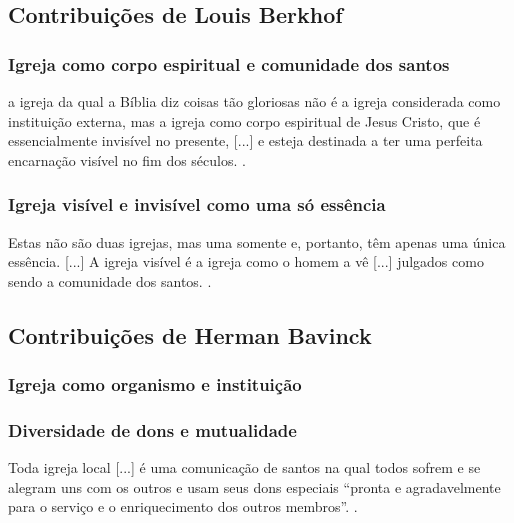 \subsection{Contribuições de Louis Berkhof}

\subsubsection{Igreja como corpo espiritual e comunidade dos santos}
\begin{citacao}
    a igreja da qual a Bíblia diz coisas tão gloriosas não é a igreja considerada como instituição externa, mas a igreja como corpo espiritual de Jesus Cristo, que é essencialmente invisível no presente, [...] e esteja destinada a ter uma perfeita encarnação visível no fim dos séculos. \cite[p. 644]{berkhof2012}.
\end{citacao}

\subsubsection{Igreja visível e invisível como uma só essência}
\begin{citacao}
Estas não são duas igrejas, mas uma somente e, portanto, têm apenas uma única essência. [...] A igreja visível é a igreja como o homem a vê [...] julgados como sendo a comunidade dos santos. \cite[p. 642]{berkhof2012}.
\end{citacao}

\subsection{Contribuições de Herman Bavinck}

\subsubsection{Igreja como organismo e instituição}

\subsubsection{Diversidade de dons e mutualidade}
\begin{citacao}
Toda igreja local [...] é uma comunicação de santos na qual todos sofrem e se alegram uns com os outros e usam seus dons especiais ``pronta e agradavelmente para o serviço e o enriquecimento dos outros membros''. \cite[p. 380]{bavinck2012}.
\end{citacao}

